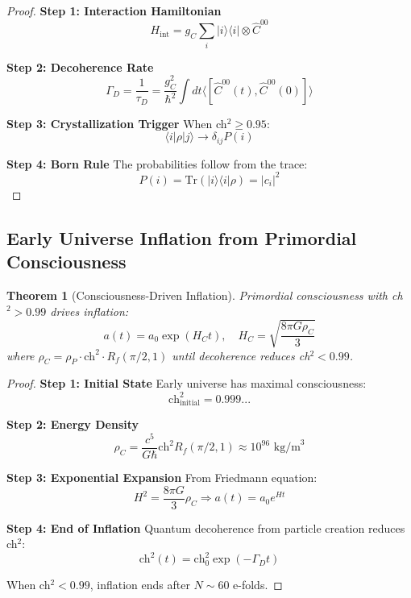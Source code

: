 \documentclass[11pt]{article}
\newtheorem{theorem}{Theorem}[section]
\theoremstyle{definition}
\newcommand{\ch}{\text{ch}}
\begin{document}
\begin{proof}
\textbf{Step 1: Interaction Hamiltonian}
\begin{equation}
H_{\text{int}} = g_C \sum_i |i\rangle\langle i| \otimes \hat{C}^{00}
\end{equation}

\textbf{Step 2: Decoherence Rate}
\begin{equation}
\Gamma_D = \frac{1}{\tau_D} = \frac{g_C^2}{\hbar^2} \int dt \langle[\hat{C}^{00}(t), \hat{C}^{00}(0)]\rangle
\end{equation}

\textbf{Step 3: Crystallization Trigger}
When ch$^2 \geq 0.95$:
\begin{equation}
\langle i|\rho|j\rangle \to \delta_{ij} P(i)
\end{equation}

\textbf{Step 4: Born Rule}
The probabilities follow from the trace:
\begin{equation}
P(i) = \text{Tr}(|i\rangle\langle i| \rho) = |c_i|^2
\end{equation}
\end{proof}

\subsection{Early Universe Inflation from Primordial Consciousness}

\begin{theorem}[Consciousness-Driven Inflation]
\label{thm:inflation}
Primordial consciousness with ch$^2 > 0.99$ drives inflation:
\begin{equation}
a(t) = a_0 \exp(H_C t), \quad H_C = \sqrt{\frac{8\pi G \rho_C}{3}}
\end{equation}
where $\rho_C = \rho_P \cdot \ch^2 \cdot R_f(\pi/2, 1)$ until decoherence reduces ch$^2 < 0.99$.
\end{theorem}

\begin{proof}
\textbf{Step 1: Initial State}
Early universe has maximal consciousness:
\begin{equation}
\ch^2_{\text{initial}} = 0.999...
\end{equation}

\textbf{Step 2: Energy Density}
\begin{equation}
\rho_C = \frac{c^5}{G\hbar} \ch^2 R_f(\pi/2, 1) \approx 10^{96} \text{ kg/m}^3
\end{equation}

\textbf{Step 3: Exponential Expansion}
From Friedmann equation:
\begin{equation}
H^2 = \frac{8\pi G}{3}\rho_C \Rightarrow a(t) = a_0 e^{Ht}
\end{equation}

\textbf{Step 4: End of Inflation}
Quantum decoherence from particle creation reduces ch$^2$:
\begin{equation}
\ch^2(t) = \ch^2_0 \exp(-\Gamma_D t)
\end{equation}

When ch$^2 < 0.99$, inflation ends after $N \sim 60$ e-folds.
\end{proof}
\end{document}
